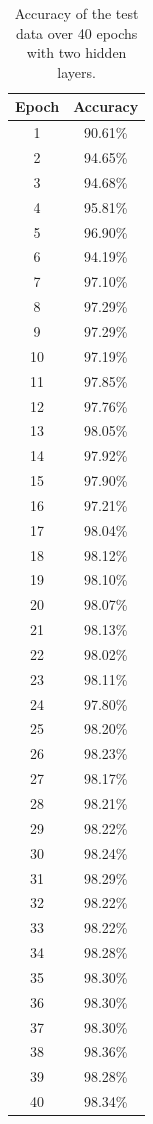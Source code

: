 \documentclass[a4paper]{article}
\begin{document}
\begin{table}[h!]
\begin{table}[H]
	\centering
	\begin{tabular}{|c|c|}
		\hline
		Epoch & Accuracy \\
		\hline
		1 & 90.61\% \\
		\hline
		2 & 94.65\%\\
		\hline 
		3 & 94.68\%\\
		\hline 
		4 & 95.81\%\\
		\hline 
		5 & 96.90\%\\
		\hline 
		6 & 94.19\%\\
		\hline 
		7 & 97.10\%\\
		\hline 
		8 & 97.29\%\\
		\hline 
		9 & 97.29\%\\
		\hline 
		10 & 97.19\%\\
		\hline 
		11 & 97.85\%\\
		\hline 
		12 & 97.76\%\\
		\hline 
		13 & 98.05\%\\
		\hline 
		14 & 97.92\%\\
		\hline 
		15 & 97.90\%\\
		\hline 
		16 & 97.21\%\\
		\hline 
		17 & 98.04\%\\
		\hline 
        18 & 98.12\%\\
		\hline 19 & 98.10\%\\
		\hline 20 & 98.07\%\\
		\hline 21 & 98.13\%\\
		\hline 22 & 98.02\%\\
		\hline 23 & 98.11\%\\
		\hline 24 & 97.80\%\\
		\hline 25 & 98.20\%\\
		\hline 26 & 98.23\%\\
		\hline 27 & 98.17\%\\
		\hline 28 & 98.21\%\\
		\hline 29 & 98.22\%\\
		\hline 30 & 98.24\%\\
		\hline 31 & 98.29\%\\
		\hline 32 & 98.22\%\\
		\hline 33 & 98.22\%\\
		\hline 34 & 98.28\%\\
		\hline 35 & 98.30\%\\
		\hline 36 & 98.30\%\\
		\hline 
		37 & 98.30\%\\
		\hline 
		38 & 98.36\%\\
		\hline 
		39 & 98.28\%\\
		\hline 
		40 & 98.34\%\\
		\hline
	\end{tabular}
	\caption{Accuracy of the test data over 40 epochs with two hidden layers. }
	\label{tab2}
\end{table}

\end{table}
\end{document}
